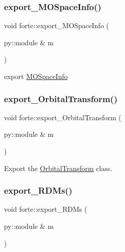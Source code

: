 \mbox{\label{namespaceforte_a005a509f4aa34de903798c1b9cb7e49a}} 
\subsubsection{\texorpdfstring{export\+\_\+\+M\+O\+Space\+Info()}{export\_MOSpaceInfo()}}
{\footnotesize\ttfamily void forte\+::export\+\_\+\+M\+O\+Space\+Info (\begin{DoxyParamCaption}\item[{py\+::module \&}]{m }\end{DoxyParamCaption})}



export \mbox{\hyperlink{classforte_1_1_m_o_space_info}{M\+O\+Space\+Info}} 

\mbox{\label{namespaceforte_ad6203980379ae5def51dc49fb3ab9cc1}} 
\subsubsection{\texorpdfstring{export\+\_\+\+Orbital\+Transform()}{export\_OrbitalTransform()}}
{\footnotesize\ttfamily void forte\+::export\+\_\+\+Orbital\+Transform (\begin{DoxyParamCaption}\item[{py\+::module \&}]{m }\end{DoxyParamCaption})}



Export the \mbox{\hyperlink{classforte_1_1_orbital_transform}{Orbital\+Transform}} class. 

\mbox{\label{namespaceforte_a37b278059430940f68bbe39180483593}} 
\subsubsection{\texorpdfstring{export\+\_\+\+R\+D\+Ms()}{export\_RDMs()}}
{\footnotesize\ttfamily void forte\+::export\+\_\+\+R\+D\+Ms (\begin{DoxyParamCaption}\item[{py\+::module \&}]{m }\end{DoxyParamCaption})}



